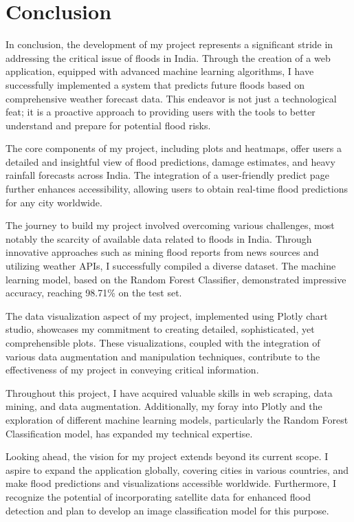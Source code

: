 \documentclass[a4paper,12pt]{report}
\begin{document}
\chapter{Conclusion}

In conclusion, the development of my project represents a significant stride in addressing the critical issue of floods in India. Through the creation of a web application, equipped with advanced machine learning algorithms, I have successfully implemented a system that predicts future floods based on comprehensive weather forecast data. This endeavor is not just a technological feat; it is a proactive approach to providing users with the tools to better understand and prepare for potential flood risks.

The core components of my project, including plots and heatmaps, offer users a detailed and insightful view of flood predictions, damage estimates, and heavy rainfall forecasts across India. The integration of a user-friendly predict page further enhances accessibility, allowing users to obtain real-time flood predictions for any city worldwide.

The journey to build my project involved overcoming various challenges, most notably the scarcity of available data related to floods in India. Through innovative approaches such as mining flood reports from news sources and utilizing weather APIs, I successfully compiled a diverse dataset. The machine learning model, based on the Random Forest Classifier, demonstrated impressive accuracy, reaching 98.71\% on the test set.

The data visualization aspect of my project, implemented using Plotly chart studio, showcases my commitment to creating detailed, sophisticated, yet comprehensible plots. These visualizations, coupled with the integration of various data augmentation and manipulation techniques, contribute to the effectiveness of my project in conveying critical information.

Throughout this project, I have acquired valuable skills in web scraping, data mining, and data augmentation. Additionally, my foray into Plotly and the exploration of different machine learning models, particularly the Random Forest Classification model, has expanded my technical expertise.

Looking ahead, the vision for my project extends beyond its current scope. I aspire to expand the application globally, covering cities in various countries, and make flood predictions and visualizations accessible worldwide. Furthermore, I recognize the potential of incorporating satellite data for enhanced flood detection and plan to develop an image classification model for this purpose.
\end{document}
